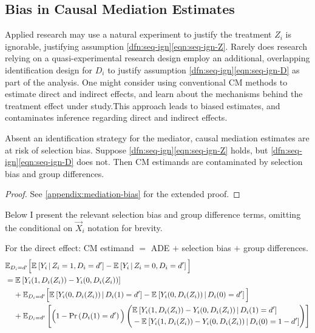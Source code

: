 \subsection{Bias in Causal Mediation Estimates}
Applied research may use a natural experiment to justify the treatment $Z_i$ is ignorable, justifying assumption \ref{dfn:seq-ign}\eqref{eqn:seq-ign-Z}.
Rarely does research relying on a quasi-experimental research design employ an additional, overlapping identification design for $D_i$ to justify assumption \ref{dfn:seq-ign}\eqref{eqn:seq-ign-D} as part of the analysis.
One might consider using conventional CM methods to estimate direct and indirect effects, and learn about the mechanisms behind the treatment effect under study.This approach leads to biased estimates, and contaminates inference regarding direct and indirect effects.%

\begin{theorem}
    \label{thm:selection-bias}
    Absent an identification strategy for the mediator, causal mediation estimates are at risk of selection bias.
    Suppose \ref{dfn:seq-ign}\eqref{eqn:seq-ign-Z} holds, but \ref{dfn:seq-ign}\eqref{eqn:seq-ign-D} does not.
    Then CM estimands are contaminated by selection bias and group differences.
\end{theorem}
\begin{proof}
    See \autoref{appendix:mediation-bias} for the extended proof.
\end{proof}
Below I present the relevant selection bias and group difference terms, omitting the conditional on $\vec X_i$ notation for brevity.

\noindent
For the direct effect: CM estimand $=$ ADE $+$ selection bias $+$ group differences.
\begin{align*}
    & \mathbb E_{D_i = d'} \Big[
        \Egiven{Y_i}{Z_i = 1, D_i = d'} - \Egiven{Y_i}{Z_i = 0, D_i = d'} \Big] \\
    & = \E{Y_i(1, D_i(Z_i)) - Y_i(0, D_i(Z_i))} \\
    & \;\;\;\; + \mathbb E_{D_i = d'} \Big[
        \Egiven{Y_i(0, D_i(Z_i))}{D_i(1) = d'} 
        - \Egiven{Y_i(0, D_i(Z_i))}{D_i(0) = d'} \Big] \\
    & \;\;\;\; + \E[D_i = d']{
        \Big(1 - \Prob{D_i(1) = d'} \Big)
        \left( \begin{aligned}
            &\Egiven{Y_i(1, D_i(Z_i)) - Y_i(0, D_i(Z_i))}{D_i(1) = d'} \\ 
            &  - \Egiven{Y_i(1, D_i(Z_i)) - Y_i(0, D_i(Z_i))}{D_i(0) = 1 - d'}
            \end{aligned} \right) }
\end{align*}

